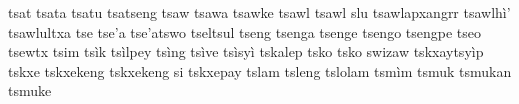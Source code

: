 \documentclass[a4paper]{article}
\begin{document}
tsat\hspace{2mm}
tsata\hspace{2mm}
tsatu\hspace{2mm}
tsatseng\hspace{2mm}
tsaw\hspace{2mm}
tsawa\hspace{2mm}
tsawke\hspace{2mm}
tsawl\hspace{2mm}
tsawl slu\hspace{2mm}
tsawlapxangrr\hspace{2mm}
tsawlhì'\hspace{2mm}
tsawlultxa\hspace{2mm}
tse\hspace{2mm}
tse'a\hspace{2mm}
tse'atswo\hspace{2mm}
tseltsul\hspace{2mm}
tseng\hspace{2mm}
tsenga\hspace{2mm}
tsenge\hspace{2mm}
tsengo\hspace{2mm}
tsengpe\hspace{2mm}
tseo\hspace{2mm}
tsewtx\hspace{2mm}
tsim\hspace{2mm}
tsìk\hspace{2mm}
tsìlpey\hspace{2mm}
tsìng\hspace{2mm}
tsìve\hspace{2mm}
tsìsyì\hspace{2mm}
tskalep\hspace{2mm}
tsko\hspace{2mm}
tsko swizaw\hspace{2mm}
tskxaytsyìp\hspace{2mm}
tskxe\hspace{2mm}
tskxekeng\hspace{2mm}
tskxekeng si\hspace{2mm}
tskxepay\hspace{2mm}
tslam\hspace{2mm}
tsleng\hspace{2mm}
tslolam\hspace{2mm}
tsmìm\hspace{2mm}
tsmuk\hspace{2mm}
tsmukan\hspace{2mm}
tsmuke\hspace{2mm}
\end{document}
